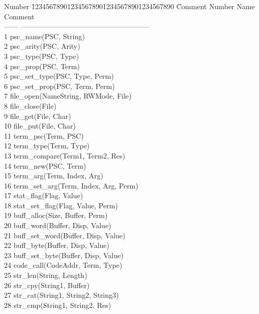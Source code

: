 \documentclass[11pt]{article}
\begin{document}
\begin{tabbing}
Number \= 1234567890123456789012345678901234567890 \= Comment \kill
Number	\> Name				\> 	Comment		\\
------ \> ------------------------------\>------------------------\\
 1 \> psc\_name(PSC, String)		\>			\\
 2 \> psc\_arity(PSC, Arity)		\>			\\
 3 \> psc\_type(PSC, Type)		\>			\\
 4 \> psc\_prop(PSC, Term)		\>			\\
 5 \> psc\_set\_type(PSC, Type, Perm)	\>			\\
 6 \> psc\_set\_prop(PSC, Term, Perm)	\>			\\
 7 \> file\_open(NameString, RWMode, File)\>			\\
 8 \> file\_close(File)			\>			\\
 9 \> file\_get(File, Char)		\>			\\
10 \> file\_put(File, Char)		\>			\\
11 \> term\_psc(Term, PSC)		\>			\\
12 \> term\_type(Term, Type)		\>			\\
13 \> term\_compare(Term1, Term2, Res)	\>			\\
14 \> term\_new(PSC, Term)		\>			\\
15 \> term\_arg(Term, Index, Arg)	\>			\\
16 \> term\_set\_arg(Term, Index, Arg, Perm)\>			\\
17 \> stat\_flag(Flag, Value)		\>			\\
18 \> stat\_set\_flag(Flag, Value, Perm)\>			\\
19 \> buff\_alloc(Size, Buffer, Perm)	\>			\\
20 \> buff\_word(Buffer, Disp, Value)	\>			\\
21 \> buff\_set\_word(Buffer, Disp, Value)\>			\\
22 \> buff\_byte(Buffer, Disp, Value)	\>			\\
23 \> buff\_set\_byte(Buffer, Disp, Value)\>			\\
24 \> code\_call(CodeAddr, Term, Type)	\>			\\
25 \> str\_len(String, Length)		\>			\\
26 \> str\_cpy(String1, Buffer)		\>			\\
27 \> str\_cat(String1, String2, String3)\>			\\
28 \> str\_cmp(String1, String2, Res)	\>			\\

\end{tabbing}
\end{document}
